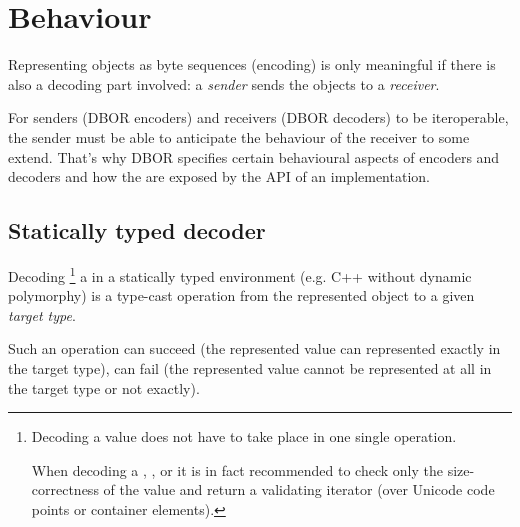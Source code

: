 
\section{Behaviour}
\label{sec:behaviour}

Representing objects as byte sequences (encoding) is only meaningful if there is also a decoding part involved:
a \emph{sender} sends the objects to a \emph{receiver}.

For senders (DBOR encoders) and receivers (DBOR decoders) to be iteroperable, the sender must be able to anticipate the
behaviour of the receiver to some extend.
That's why DBOR specifies certain behavioural aspects of encoders and decoders and how the are exposed by the API
of an implementation.


\subsection{Statically typed decoder}

Decoding%
\footnote{
    Decoding a value does not have to take place in one single operation.

    When decoding a \DborUtfEightStringValue, \DborSequenceValue, or \DborDictionaryValue{} it is in fact recommended to
    check only the size-correctness of the value and return a validating iterator
    (over Unicode code points or container elements).
}
a \DborValue{} in a statically typed environment (e.g. C++ without dynamic polymorphy) is a
type-cast operation from the represented object to a given \emph{target type}.

Such an operation can succeed (the represented value can represented exactly in the target type),
can fail (the represented value cannot be represented at all in the target type or not exactly).

